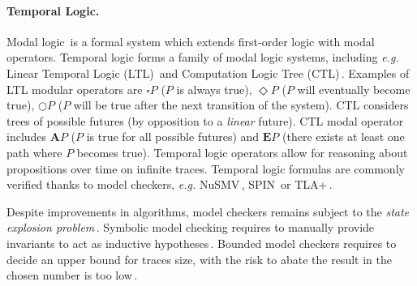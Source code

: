 
\paragraph{Temporal Logic.}
%
Modal logic\,\cite{chagrov1997modal} is a formal system which extends
first-order logic with modal operators.
%
Temporal logic forms a family of modal logic systems, including \emph{e.g.}
Linear Temporal Logic (LTL)\,\cite{sistla1985ltl} and Computation Logic Tree
(CTL)\,\cite{clarke1981ctl}.
%
Examples of LTL modular operators are \( \square P \) (\( P \) is always true),
\( \Diamond P \) (\( P \) will eventually become true), \( \bigcirc P \)
(\( P \) will be true after the next transition of the system).
%
CTL considers trees of possible futures (by opposition to a \emph{linear}
future).
%
CTL modal operator includes \( \mathbf{A} P \) (\( P \) is true for all possible
futures) and \( \mathbf{E} P \) (there exists at least one path where \( P \)
becomes true).
%
Temporal logic operators allow for reasoning about propositions over time on
infinite traces.
%
Temporal logic formulas are commonly verified thanks to model checkers,
\emph{e.g.}  NuSMV\,\cite{cimatti2002nusmv}, SPIN\,\cite{holzmann1997spin} or
TLA+\,\cite{lamport2002tla}.

Despite improvements in algorithms, model checkers remains subject to the
\emph{state explosion problem}\,\cite{clarke2012model}.
%
%
%
Symbolic model checking requires to manually provide invariants to act as
inductive hypotheses\,\cite{mcmillan2000symbolic}.
%
Bounded model checkers requires to decide an upper bound for traces size, with
the risk to abate the result in the chosen number is too
low\,\cite{biere2003bounded}.

